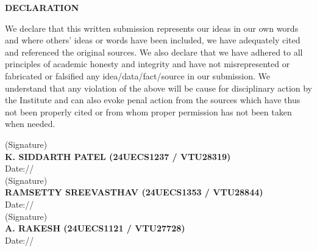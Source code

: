 \documentclass[10pt]{report}
\begin{document}
\newpage
\begin{center}
\Huge \textbf{DECLARATION}
\end{center}
\vspace{1.0cm}
\linespread{1.5}
\large{
We declare that this written submission represents our ideas in our own words and where others' ideas or words have been included, we have adequately cited and referenced the original sources. We also declare that we have adhered to all principles of academic honesty and integrity and have not misrepresented or fabricated or falsified any idea/data/fact/source in our submission. We understand that any violation of the above will be cause for disciplinary action by the Institute and can also evoke penal action from the sources which have thus not been properly cited or from whom proper permission has not been taken when needed.}
\vspace{2.0cm}
\begin{flushright}
(Signature)\\[0.2cm]
\large{\textbf{K. SIDDARTH PATEL (24UECS1237 / VTU28319)}}\\[0.1cm]
\large{Date:\hspace*{1.0cm}/\hspace*{1.0cm}/}\\[1.5cm]
(Signature)\\[0.2cm]
\large{\textbf{RAMSETTY SREEVASTHAV (24UECS1353 / VTU28844)}}\\[0.1cm]
\large{Date:\hspace*{1.0cm}/\hspace*{1.0cm}/}\\[1.5cm]
(Signature)\\[0.2cm]
\large{\textbf{A. RAKESH (24UECS1121 / VTU27728)}}\\[0.1cm]
\large{Date:\hspace*{1.0cm}/\hspace*{1.0cm}/}
\end{flushright}
\end{document}
